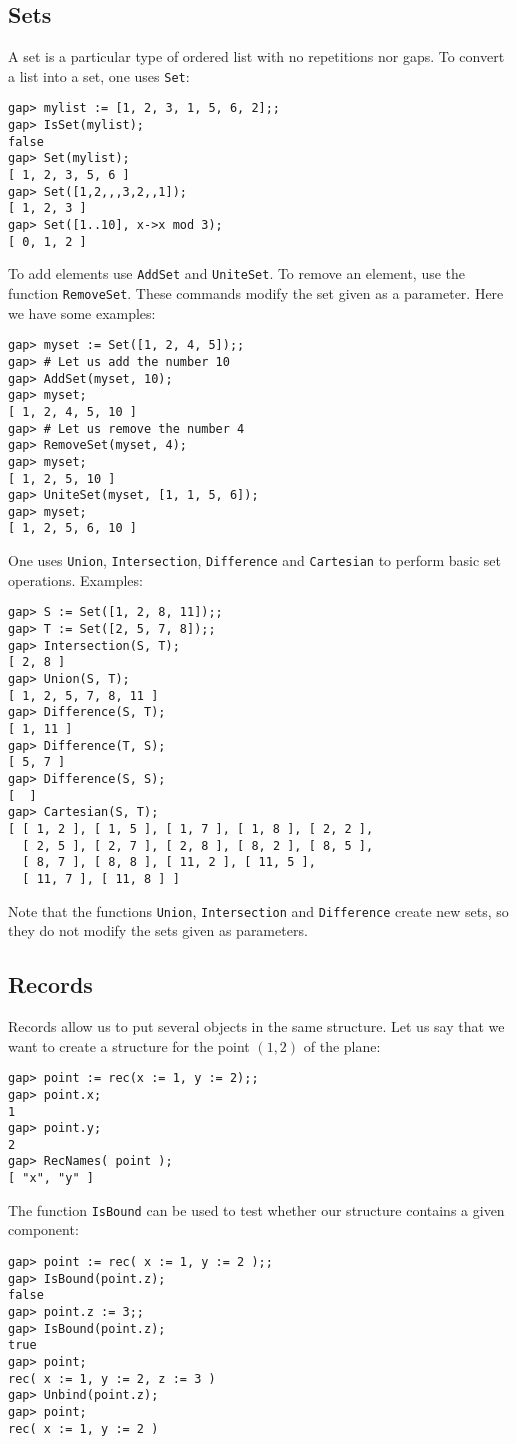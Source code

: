 \subsection{Sets} 

A set is a particular type of ordered list with no
repetitions nor gaps.  
To convert a list into a set, one uses \lstinline{Set}: 
\begin{lstlisting}
gap> mylist := [1, 2, 3, 1, 5, 6, 2];;
gap> IsSet(mylist);
false
gap> Set(mylist);
[ 1, 2, 3, 5, 6 ]
gap> Set([1,2,,,3,2,,1]);
[ 1, 2, 3 ]
gap> Set([1..10], x->x mod 3);
[ 0, 1, 2 ]
\end{lstlisting}

To add elements use 
\lstinline{AddSet} and \lstinline{UniteSet}. To remove an element, use the function 
\lstinline{RemoveSet}.
These commands modify the set given as a  parameter.
Here we have some examples:
\begin{lstlisting}
gap> myset := Set([1, 2, 4, 5]);;
gap> # Let us add the number 10 
gap> AddSet(myset, 10);
gap> myset;
[ 1, 2, 4, 5, 10 ]
gap> # Let us remove the number 4 
gap> RemoveSet(myset, 4);
gap> myset;
[ 1, 2, 5, 10 ]
gap> UniteSet(myset, [1, 1, 5, 6]);
gap> myset;
[ 1, 2, 5, 6, 10 ]
\end{lstlisting}
One uses
\lstinline{Union}, \lstinline{Intersection},
\lstinline{Difference} and \lstinline{Cartesian}
to perform basic set operations. 
Examples: 
\begin{lstlisting}
gap> S := Set([1, 2, 8, 11]);;
gap> T := Set([2, 5, 7, 8]);;
gap> Intersection(S, T);
[ 2, 8 ]
gap> Union(S, T);
[ 1, 2, 5, 7, 8, 11 ]
gap> Difference(S, T);
[ 1, 11 ]
gap> Difference(T, S);
[ 5, 7 ]
gap> Difference(S, S);
[  ]
gap> Cartesian(S, T);
[ [ 1, 2 ], [ 1, 5 ], [ 1, 7 ], [ 1, 8 ], [ 2, 2 ], 
  [ 2, 5 ], [ 2, 7 ], [ 2, 8 ], [ 8, 2 ], [ 8, 5 ], 
  [ 8, 7 ], [ 8, 8 ], [ 11, 2 ], [ 11, 5 ], 
  [ 11, 7 ], [ 11, 8 ] ]
\end{lstlisting}

Note that the functions \lstinline{Union}, \lstinline{Intersection} and
\lstinline{Difference} create new sets, so they 
do not modify the sets given as parameters.

\subsection{Records}

Records allow us to put several objects in the same structure. Let us say that
we want to create a structure for the point $(1,2)$ of the plane: 
\begin{lstlisting}
gap> point := rec(x := 1, y := 2);;
gap> point.x;
1
gap> point.y;
2
gap> RecNames( point );
[ "x", "y" ]
\end{lstlisting}
The function \lstinline{IsBound} can be used to test whether our structure
contains a given component:
\begin{lstlisting}
gap> point := rec( x := 1, y := 2 );;
gap> IsBound(point.z);
false
gap> point.z := 3;;
gap> IsBound(point.z);
true
gap> point;
rec( x := 1, y := 2, z := 3 )
gap> Unbind(point.z);
gap> point;
rec( x := 1, y := 2 )
\end{lstlisting}

